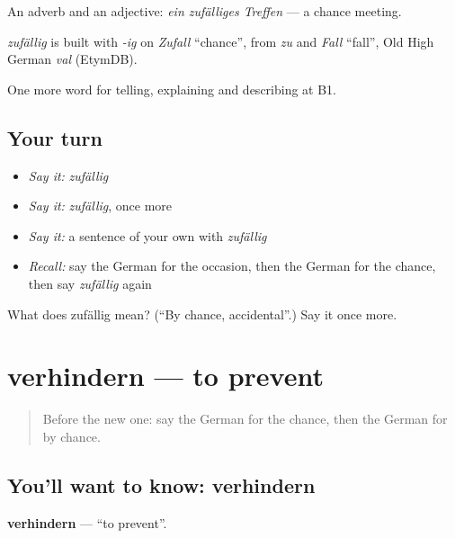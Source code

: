 An adverb and an adjective: \emph{ein zufälliges Treffen} — a chance meeting.

\begin{cousinweb}
\emph{zufällig} is built with \emph{-ig} on \emph{Zufall} \textquotedblleft{}chance\textquotedblright{}, from \emph{zu} and \emph{Fall} \textquotedblleft{}fall\textquotedblright{}, Old High German \emph{val} (EtymDB).
\end{cousinweb}

\begin{grammarlens}[title={What you've built}]
One more word for telling, explaining and describing at B1.
\end{grammarlens}

\subsection*{Your turn}
\begin{itemize}
\raggedright
  \item \emph{Say it:} \emph{zufällig}
  \item \emph{Say it:} \emph{zufällig}, once more
  \item \emph{Say it:} a sentence of your own with \emph{zufällig}
  \item \emph{Recall:} say the German for the occasion, then the German for the chance, then say \emph{zufällig} again
\end{itemize}

\begin{tcolorbox}[breakable,colback=teal!4,colframe=teal!35!black,title={Before you move on}]
What does zufällig mean? (\textquotedblleft{}By chance, accidental\textquotedblright{}.) Say it once more.
\end{tcolorbox}
\section[verhindern]{verhindern — to prevent}

\label{lesson:GE-C347-verhindern}



\begin{quote}
Before the new one: say the German for the chance, then the German for by chance.
\end{quote}

\subsection*{You'll want to know: verhindern}
\textbf{verhindern} — \textquotedblleft{}to prevent\textquotedblright{}.

